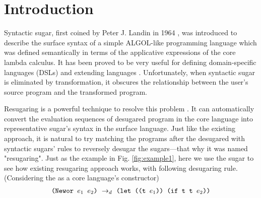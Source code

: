 \section{Introduction}









Syntactic sugar, first coined by Peter J. Landin in 1964 \cite{syntacticsugar}, was introduced to describe the surface syntax of a simple ALGOL-like programming language which was defined semantically in terms of the applicative expressions of the core lambda calculus. It has been proved to be very useful for defining domain-specific languages (DSLs) and extending languages \cite{FellFFKBMT18,CulpFFK19}.
Unfortunately, when syntactic sugar is eliminated by transformation, it obscures the relationship between the user’s source program and the transformed program.



Resugaring is a powerful technique to resolve this problem \cite{resugaring,hygienic}. It  can automatically convert the evaluation sequences of desugared program in the core language into representative sugar's syntax in the surface language. Just like the existing approach, it is natural to try matching the programs after the desugared with syntactic sugars' rules to reversely desugar the sugars---that why it was named "resugaring". Just as the example in Fig. \ref{fig:example1}, here we use the sugar  to see how existing resugaring approach works, with following desugaring rule. (Considering the  as a core language's constructor)
\[
\begin{array}{l}
\texttt{(Newor $e_1$ $e_2$)} ~\rightarrow_d~ \texttt{(let ((t $e_1$)) (if t t $e_2$))}\\
\end{array}
\]

